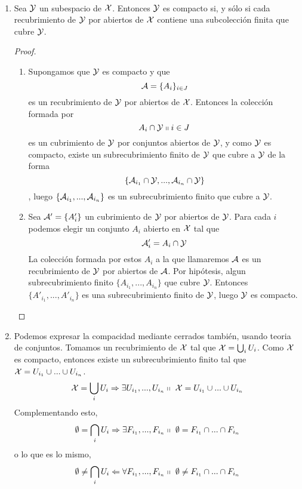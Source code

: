 \begin{obs} \
	\begin{enumerate}
		\item Sea $\mathcal{Y}$ un subespacio de $\mathcal{X}$. Entonces $\mathcal{Y}$ es compacto si, y sólo si cada recubrimiento de $\mathcal{Y}$ por abiertos de $\mathcal{X}$ contiene una subcolección finita que cubre $\mathcal{Y}$.
		\begin{proof} \
			\begin{enumerate}
				\item[\bra] 	Supongamos que $\mathcal{Y}$ es compacto y que 
					\begin{equation}
						\mathcal{A}=\{A_i\}_{i \in J}
					\end{equation}
					es un recubrimiento de $\mathcal{Y}$ por abiertos de $\mathcal{X}$. Entonces la colección formada por
					\begin{equation}
						{A_i \cap \mathcal{Y}\shortparallel i \in J}
					\end{equation} es un cubrimiento de $\mathcal{Y}$ por conjuntos abiertos de $\mathcal{Y}$, y como $\mathcal{Y}$ es compacto, existe un subrecubrimiento finito de $\mathcal{Y}$ que cubre a $\mathcal{Y}$ de la forma
					\begin{equation}
						\{\mathcal{A}_{i_1} \cap \mathcal{Y}, ... , \mathcal{A}_{i_n} \cap \mathcal{Y}\} 
					\end{equation}
						, luego $\{\mathcal{A}_{i_1}, ... , \mathcal{A}_{i_n}\}$ es un subrecubrimiento finito que cubre a $\mathcal{Y}$.
				
				\item[\bla] Sea $\mathcal{A}'=\{A'_{i}\}$ un cubrimiento de $\mathcal{Y}$ por abiertos de $\mathcal{Y}$. Para cada $i$ podemos elegir un conjunto $A_i$ abierto en $\mathcal{X}$ tal que 
					\begin{equation}
							\mathcal{A}'_i=A_i \cap \mathcal{Y}
					\end{equation}
					La colección formada por estos $A_i$ a la que llamaremos $\mathcal{A}$ es un recubrimiento de $\mathcal{Y}$ por abiertos de $\mathcal{A}$. Por hipótesis, algun subrecubrimiento finito $\{A_{i_1},...,A_{i_n}\}$ que cubre $\mathcal{Y}$. Entonces $\{A'_{i_1},...,A'_{i_n}\}$ es una subrecubrimiento finito de $\mathcal{Y}$, luego $\mathcal{Y}$ es compacto.
			\end{enumerate}
		\end{proof}
		\item Podemos expresar la compacidad mediante cerrados también, usando teoria de conjuntos.
		Tomamos un recubrimiento de $\mathcal{X}$ tal que $\mathcal{X} = \bigcup_{i}U_i$. Como $\mathcal{X}$ es compacto, entonces existe un subrecubrimiento finito tal que $\mathcal{X} = U_{i_1} \cup ... \cup U_{i_n}$.
		\begin{equation}
			\mathcal{X} = \bigcup_{i}U_i \Rightarrow \exists U_{i_1},..., U_{i_n} \shortparallel\ \mathcal{X} = U_{i_1} \cup ... \cup U_{i_n}
		\end{equation}
		Complementando esto,
		\begin{equation}
			\emptyset = \bigcap_{i}U_i \Rightarrow \exists F_{i_1},..., F_{i_n} \shortparallel\ \emptyset = F_{i_1} \cap ... \cap F_{i_n}
		\end{equation}
		o lo que es lo mismo,
		\begin{equation}
			\emptyset \neq \bigcap_{i}U_i \Leftarrow \forall F_{i_1},..., F_{i_n} \shortparallel\ \emptyset \neq F_{i_1} \cap ... \cap F_{i_n}
		\end{equation}
	\end{enumerate}
\end{obs}


